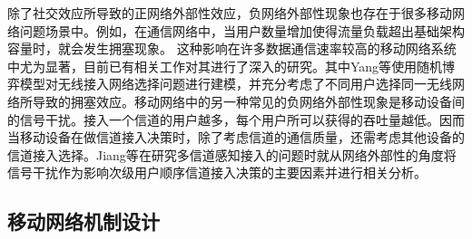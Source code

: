 
除了社交效应所导致的正网络外部性效应，负网络外部性现象也存在于很多移动网络问题场景中。例如，在通信网络中，当用户数量增加使得流量负载超出基础架构容量时，就会发生拥塞现象。
这种影响在许多数据通信速率较高的移动网络系统中尤为显著，目前已有相关工作对其进行了深入的研究\cite{Asuman07,Fang09,Tran12,rayliu2,rayliu3}。其中Yang等\cite{rayliu2}使用随机博弈模型对无线接入网络选择问题进行建模，并充分考虑了不同用户选择同一无线网络所导致的拥塞效应。移动网络中的另一种常见的负网络外部性现象是移动设备间的信号干扰。接入一个信道的用户越多，每个用户所可以获得的吞吐量越低。因而当移动设备在做信道接入决策时，除了考虑信道的通信质量，还需考虑其他设备的信道接入选择。Jiang等\cite{rayliu1}在研究多信道感知接入的问题时就从网络外部性的角度将信号干扰作为影响次级用户顺序信道接入决策的主要因素并进行相关分析。

\iffalse
\subsection{移动网络机制设计}
